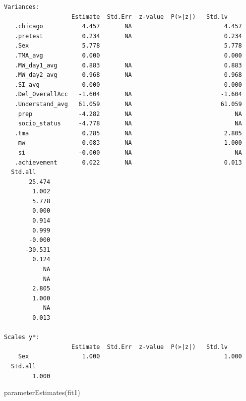 \documentclass[
  letterpaper,
  DIV=11,
  numbers=noendperiod]{scrartcl}
\newenvironment{Shaded}{\begin{snugshade}}{\end{snugshade}}
\newcommand{\FunctionTok}[1]{\textcolor[rgb]{0.28,0.35,0.67}{#1}}
\newcommand{\NormalTok}[1]{\textcolor[rgb]{0.00,0.23,0.31}{#1}}
\begin{document}
\begin{verbatim}
Variances:
                   Estimate  Std.Err  z-value  P(>|z|)   Std.lv    
   .chicago           4.457       NA                          4.457
   .pretest           0.234       NA                          0.234
   .Sex               5.778                                   5.778
   .TMA_avg           0.000                                   0.000
   .MW_day1_avg       0.883       NA                          0.883
   .MW_day2_avg       0.968       NA                          0.968
   .SI_avg            0.000                                   0.000
   .Del_OverallAcc   -1.604       NA                         -1.604
   .Understand_avg   61.059       NA                         61.059
    prep             -4.282       NA                             NA
    socio_status     -4.778       NA                             NA
   .tma               0.285       NA                          2.805
    mw                0.083       NA                          1.000
    si               -0.000       NA                             NA
   .achievement       0.022       NA                          0.013
  Std.all    
       25.474
        1.002
        5.778
        0.000
        0.914
        0.999
       -0.000
      -30.531
        0.124
           NA
           NA
        2.805
        1.000
           NA
        0.013

Scales y*:
                   Estimate  Std.Err  z-value  P(>|z|)   Std.lv    
    Sex               1.000                                   1.000
  Std.all    
        1.000
\end{verbatim}

\begin{Shaded}
\begin{Highlighting}[]
\FunctionTok{parameterEstimates}\NormalTok{(fit1)}
\end{Highlighting}
\end{Shaded}
\end{document}
